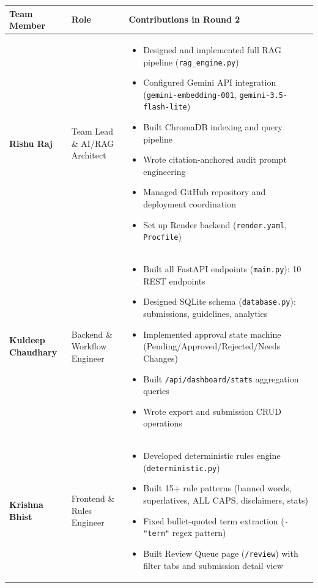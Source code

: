 \documentclass[11pt,a4paper]{article}
\begin{document}
\begin{table}[H]
\centering
\begin{tabular}{p{} p{} p{}}
\toprule
\textbf{Team Member} & \textbf{Role} & \textbf{Contributions in Round 2} \\
\midrule
\textbf{Rishu Raj} & Team Lead \& AI/RAG Architect &
\begin{itemize}[nosep,leftmargin=*]
    \item Designed and implemented full RAG pipeline (\texttt{rag\_engine.py})
    \item Configured Gemini API integration (\texttt{gemini-embedding-001}, \texttt{gemini-3.5-flash-lite})
    \item Built ChromaDB indexing and query pipeline
    \item Wrote citation-anchored audit prompt engineering
    \item Managed GitHub repository and deployment coordination
    \item Set up Render backend (\texttt{render.yaml}, \texttt{Procfile})
\end{itemize} \\
\addlinespace
\textbf{Kuldeep Chaudhary} & Backend \& Workflow Engineer &
\begin{itemize}[nosep,leftmargin=*]
    \item Built all FastAPI endpoints (\texttt{main.py}): 10 REST endpoints
    \item Designed SQLite schema (\texttt{database.py}): submissions, guidelines, analytics
    \item Implemented approval state machine (Pending/Approved/Rejected/Needs Changes)
    \item Built \texttt{/api/dashboard/stats} aggregation queries
    \item Wrote export and submission CRUD operations
\end{itemize} \\
\addlinespace
\textbf{Krishna Bhist} & Frontend \& Rules Engineer &
\begin{itemize}[nosep,leftmargin=*]
    \item Developed deterministic rules engine (\texttt{deterministic.py})
    \item Built 15+ rule patterns (banned words, superlatives, ALL CAPS, disclaimers, stats)
    \item Fixed bullet-quoted term extraction (\texttt{- "term"} regex pattern)
    \item Built Review Queue page (\texttt{/review}) with filter tabs and submission detail view

\end{itemize}
\end{tabular}
\end{table}
\end{document}
